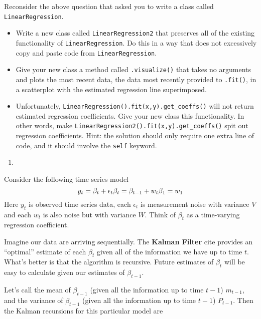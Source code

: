 \documentclass[12pt,krantz2]{krantz}
\providecommand{\tightlist}{%
  \setlength{\itemsep}{0pt}\setlength{\parskip}{0pt}}
\begin{document}
Reconsider the above question that asked you to write a class called \texttt{LinearRegression}.

\begin{itemize}
\tightlist
\item
  Write a new class called \texttt{LinearRegression2} that preserves all of the existing functionality of \texttt{LinearRegression}. Do this in a way that does not excessively copy and paste code from \texttt{LinearRegression}.
\item
  Give your new class a method called \texttt{.visualize()} that takes no arguments and plots the most recent data, the data most recently provided to \texttt{.fit()}, in a scatterplot with the estimated regression line superimposed.
\item
  Unfortunately, \texttt{LinearRegression().fit(x,y).get\_coeffs()} will not return estimated regression coefficients. Give your new class this functionality. In other words, make \texttt{LinearRegression2().fit(x,y).get\_coeffs()} spit out regression coefficients. Hint: the solution should only require one extra line of code, and it should involve the \texttt{self} keyword.
\end{itemize}

\begin{enumerate}
\def\labelenumi{\arabic{enumi}.}
\setcounter{enumi}{2}
\item
\end{enumerate}

Consider the following time series model \citep{West1989BayesianFA}
\begin{equation} 
y_t = \beta_t + \epsilon_t \\
\beta_t = \beta_{t-1} + w_t \\
\beta_1 = w_1
\end{equation}
Here \(y_t\) is observed time series data, each \(\epsilon_t\) is measurement noise with variance \(V\) and each \(w_t\) is also noise but with variance \(W\). Think of \(\beta_t\) as a time-varying regression coefficient.

Imagine our data are arriving sequentially. The \textbf{Kalman Filter} \citep{kalman_filt} cite provides an ``optimal'' estimate of each \(\beta_t\) given all of the information we have up to time \(t\). What's better is that the algorithm is recursive. Future estimates of \(\beta_t\) will be easy to calculate given our estimates of \(\beta_{t-1}\).

Let's call the mean of \(\beta_{t-1}\) (given all the information up to time \(t-1\)) \(m_{t-1}\), and the variance of \(\beta_{t-1}\) (given all the information up to time \(t-1\)) \(P_{t-1}\). Then the Kalman recursions for this particular model are
\end{document}
